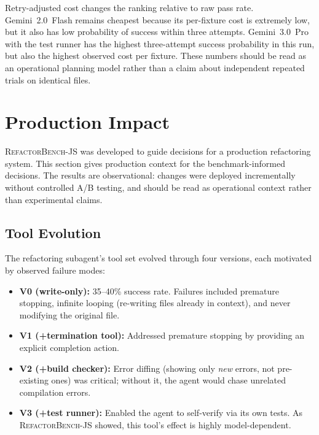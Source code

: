 \documentclass[11pt,letterpaper]{article}
\begin{document}
Retry-adjusted cost changes the ranking relative to raw pass rate. Gemini~2.0~Flash remains cheapest because its per-fixture cost is extremely low, but it also has low probability of success within three attempts. Gemini~3.0~Pro with the test runner has the highest three-attempt success probability in this run, but also the highest observed cost per fixture. These numbers should be read as an operational planning model rather than a claim about independent repeated trials on identical files.

\section{Production Impact}
\label{sec:production}

\textsc{RefactorBench}-JS was developed to guide decisions for a production refactoring system. This section gives production context for the benchmark-informed decisions. The results are observational: changes were deployed incrementally without controlled A/B testing, and should be read as operational context rather than experimental claims.

\subsection{Tool Evolution}

The refactoring subagent's tool set evolved through four versions, each motivated by observed failure modes:

\begin{itemize}[leftmargin=2em]
\item \textbf{V0 (write-only):} 35--40\% success rate. Failures included premature stopping, infinite looping (re-writing files already in context), and never modifying the original file.
\item \textbf{V1 (+termination tool):} Addressed premature stopping by providing an explicit completion action.
\item \textbf{V2 (+build checker):} Error diffing (showing only \emph{new} errors, not pre-existing ones) was critical; without it, the agent would chase unrelated compilation errors.
\item \textbf{V3 (+test runner):} Enabled the agent to self-verify via its own tests. As \textsc{RefactorBench}-JS showed, this tool's effect is highly model-dependent.
\end{itemize}
\end{document}
